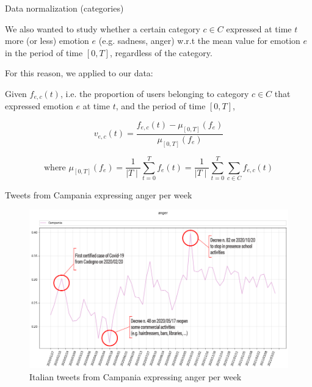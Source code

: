 \documentclass[8pt]{beamer}  %
\begin{document}
\begin{frame}{Data normalization (categories)}
	
	We also wanted to study whether a certain category \(c \in C\) expressed at time \(t\) more (or less) emotion \(e\) (e.g. sadness, anger) w.r.t the mean value for emotion \(e\) in the period of time \([0, T]\), regardless of the category.

    For this reason, we applied  to our data:
    	
    \begin{definition}
    \label{def:categories-normalization}
    	Given \(f_{e, c}(t)\), i.e. the proportion of users belonging to category \(c \in C\) that expressed emotion \(e\) at time \(t\), and the period of time \([0,T]\),
    	
    	\[v_{e, c}(t) = \frac{f_{e, c}(t) - \mu_{[0,T]}(f_e)}{\mu_{[0,T]}(f_e)}\]
    	
    	\[\text{where } \mu_{[0,T]}(f_e) = \frac{1}{\mid T \mid} \sum_{t =0}^{T} f_e(t) = \frac{1}{\mid T \mid} \sum_{t =0}^{T} \sum_{c \in C} f_{e, c}(t)\] 
    \end{definition}
	
\end{frame}

\begin{frame}{Tweets from Campania expressing anger per week}
    
    \begin{figure}
        \centering
        \includegraphics[scale=0.3]{assets/img/it_Campania_anger_with_events.png}
        \caption{Italian tweets from Campania expressing anger per week}
        \label{fig:it_Campania_anger}
    \end{figure}
    
\end{frame}
\end{document}
